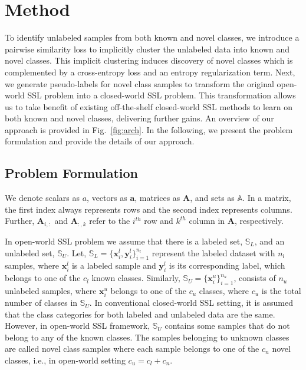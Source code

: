 \documentclass[runningheads]{eccv2022submission}
\begin{document}
\vspace{-2mm}
\section{Method}
\vspace{-2mm}
\label{sec:method}

To identify unlabeled samples from both known and novel classes, we introduce a pairwise similarity loss to implicitly cluster the unlabeled data into known and novel classes. This implicit clustering induces discovery of novel classes which is complemented by a cross-entropy loss and an entropy regularization term. Next, we generate pseudo-labels for novel class samples to transform the original open-world SSL problem into a closed-world SSL problem. This transformation allows us to take benefit of existing off-the-shelf closed-world SSL methods to learn on both known and novel classes, delivering further gains. 
An overview of our approach is provided in Fig.~\ref{fig:arch}. In the following, we present the problem formulation and provide the details of our approach.


\subsection{Problem Formulation}
\vspace{-2mm}
We denote scalars as $a$, vectors as $\mathbf{a}$, matrices as $\mathbf{A}$, and sets as $\mathbb{A}$. In a matrix, the first index always represents rows and the second index represents columns. Further, $\mathbf{A}_{i,:}$ and $\mathbf{A}_{:,k}$ refer to the $i^{th}$ row and  $k^{th}$ column in $\mathbf{A}$, respectively.

In open-world SSL problem we assume that there is a labeled set, $\mathbb{S}_L$, and an unlabeled set, $\mathbb{S}_U$. Let, $\mathbb{S}_L = \{\mathbf{x}^l_i, {\mathbf{y}}^l_i\}_{i=1}^{n_l}$ represent the labeled dataset with $n_l$ samples, where $\mathbf{x}_i^l$ is a labeled sample and ${\mathbf{y}}^l_i$ is its corresponding label, which belongs to one of the $c_l$ known classes. Similarly, $\mathbb{S}_U=\{\mathbf{x}_{i}^u\}_{i=1}^{n_u}$, consists of $n_u$ unlabeled samples, where $\mathbf{x}_{i}^u$ belongs to one of the $c_u$ classes, where $c_u$ is the total number of classes in $\mathbb{S}_U$. In conventional closed-world SSL setting, it is assumed that the class categories for both labeled and unlabeled data are the same. However, in open-world SSL framework, $\mathbb{S}_U$ contains some samples that do not belong to any of the known classes. The samples belonging to unknown classes are called novel class samples where each sample belongs to one of the $c_n$ novel classes, i.e., in open-world setting $c_u = c_l + c_n$.  
\end{document}
